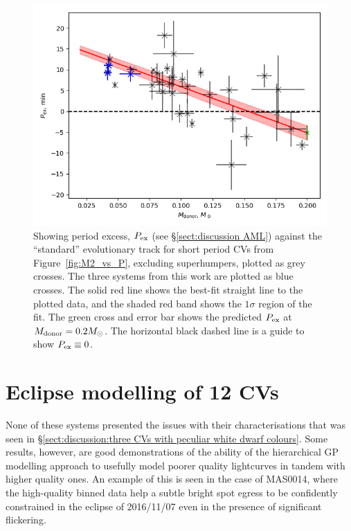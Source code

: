 \begin{figure}
    \centering
    \includegraphics[width=\columnwidth]{figures/results/three_cvs_with_weird_colours/GeneralFigs/p_excess_line_fit.png}
    \caption{Showing period excess, $P_{\rm ex}$ (see \S\ref{sect:discussion AML}) against the \citet{knigge11} ``standard'' evolutionary track for short period CVs from Figure~\ref{fig:M2_vs_P}, excluding superhumpers, plotted as grey crosses. The three systems from this work are plotted as blue crosses. The solid red line shows the best-fit straight line to the plotted data, and the shaded red band shows the $1\sigma$ region of the fit. The green cross and error bar shows the predicted $P_{\rm ex}$ at $M_{\rm donor} = 0.2 M_\odot$. The horizontal black dashed line is a guide to show $P_{\rm ex} \equiv 0$.}
    \label{fig:period excess}
\end{figure}


\section{Eclipse modelling of 12 CVs}
\label{sect:discussion:eclipse modelling of 12 CVs}

None of these systems presented the issues with their characterisations that was seen in \S\ref{sect:discussion:three CVs with peculiar white dwarf colours}.
Some results, however, are good demonstrations of the ability of the hierarchical GP modelling approach to usefully model poorer quality lightcurves in tandem with higher quality ones.
An example of this is seen in the case of MAS0014, where the high-quality binned data help a subtle bright spot egress to be confidently constrained in the eclipse of 2016/11/07 even in the presence of significant flickering.

